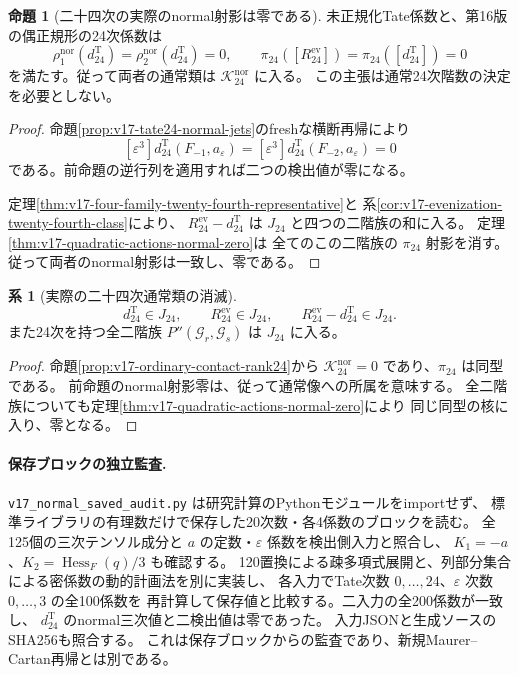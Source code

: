 \documentclass[a4paper,11pt]{ltjsarticle}
\theoremstyle{definition}
\newtheorem{proposition}[theorem]{命題}
\newtheorem{corollary}[theorem]{系}
\begin{document}
\begin{proposition}[二十四次の実際のnormal射影は零である]
\label{prop:v17-actual-normal-projection-zero}
未正規化Tate係数と、第16版の偶正規形の24次係数は
\[
 \rho_1^{\mathrm{nor}}(d_{24}^{\mathrm T})
 =\rho_2^{\mathrm{nor}}(d_{24}^{\mathrm T})=0,\qquad
 \pi_{24}([R_{24}^{\mathrm{ev}}])
 =\pi_{24}([d_{24}^{\mathrm T}])=0
\]
を満たす。従って両者の通常類は $\mathcal K_{24}^{\mathrm{nor}}$ に入る。
この主張は通常24次階数の決定を必要としない。
\end{proposition}

\begin{proof}
命題\ref{prop:v17-tate24-normal-jets}のfreshな横断再帰により
\[
 [\varepsilon^3]d_{24}^{\mathrm T}(F_{-1},a_\varepsilon)
 =
 [\varepsilon^3]d_{24}^{\mathrm T}(F_{-2},a_\varepsilon)=0
\]
である。前命題の逆行列を適用すれば二つの検出値が零になる。

定理\ref{thm:v17-four-family-twenty-fourth-representative}と
系\ref{cor:v17-evenization-twenty-fourth-class}により、
$R_{24}^{\mathrm{ev}}-d_{24}^{\mathrm T}$ は $J_{24}$ と四つの二階族の和に入る。
定理\ref{thm:v17-quadratic-actions-normal-zero}は
全てのこの二階族の $\pi_{24}$ 射影を消す。
従って両者のnormal射影は一致し、零である。
\end{proof}

\begin{corollary}[実際の二十四次通常類の消滅]
\label{cor:v17-actual-twenty-fourth-class-zero}
\[
 d_{24}^{\mathrm T}\in J_{24},\qquad
 R_{24}^{\mathrm{ev}}\in J_{24},\qquad
 R_{24}^{\mathrm{ev}}-d_{24}^{\mathrm T}\in J_{24}.
\]
また24次を持つ全二階族 $P''(\mathcal G_r,\mathcal G_s)$ は $J_{24}$ に入る。
\end{corollary}

\begin{proof}
命題\ref{prop:v17-ordinary-contact-rank24}から
$\mathcal K_{24}^{\mathrm{nor}}=0$ であり、$\pi_{24}$ は同型である。
前命題のnormal射影零は、従って通常像への所属を意味する。
全二階族についても定理\ref{thm:v17-quadratic-actions-normal-zero}により
同じ同型の核に入り、零となる。
\end{proof}

\paragraph{保存ブロックの独立監査.}
\nolinkurl{v17_normal_saved_audit.py} は研究計算のPythonモジュールをimportせず、
標準ライブラリの有理数だけで保存した20次数・各4係数のブロックを読む。
全125個の三次テンソル成分と $a$ の定数・$\varepsilon$ 係数を検出側入力と照合し、
$K_1=-a$、$K_2=\operatorname{Hess}_F(q)/3$ も確認する。
120置換による疎多項式展開と、列部分集合による密係数の動的計画法を別に実装し、
各入力でTate次数 $0,\ldots,24$、$\varepsilon$ 次数 $0,\ldots,3$ の全100係数を
再計算して保存値と比較する。二入力の全200係数が一致し、
$d_{24}^{\mathrm T}$ のnormal三次値と二検出値は零であった。
入力JSONと生成ソースのSHA256も照合する。
これは保存ブロックからの監査であり、新規Maurer--Cartan再帰とは別である。
\end{document}

